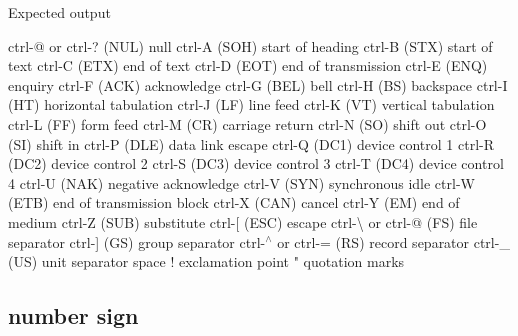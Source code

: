 Expected output

ctrl-\/@ or ctrl-\/? (N\+UL) null ctrl-\/A (S\+OH) start of heading ctrl-\/B (S\+TX) start of text ctrl-\/C (E\+TX) end of text ctrl-\/D (E\+OT) end of transmission ctrl-\/E (E\+NQ) enquiry ctrl-\/F (A\+CK) acknowledge ctrl-\/G (B\+EL) bell ctrl-\/H (BS) backspace ctrl-\/I (HT) horizontal tabulation ctrl-\/J (LF) line feed ctrl-\/K (VT) vertical tabulation ctrl-\/L (FF) form feed ctrl-\/M (CR) carriage return ctrl-\/N (SO) shift out ctrl-\/O (SI) shift in ctrl-\/P (D\+LE) data link escape ctrl-\/Q (D\+C1) device control 1 ctrl-\/R (D\+C2) device control 2 ctrl-\/S (D\+C3) device control 3 ctrl-\/T (D\+C4) device control 4 ctrl-\/U (N\+AK) negative acknowledge ctrl-\/V (S\+YN) synchronous idle ctrl-\/W (E\+TB) end of transmission block ctrl-\/X (C\+AN) cancel ctrl-\/Y (EM) end of medium ctrl-\/Z (S\+UB) substitute ctrl-\/\mbox{[} (E\+SC) escape ctrl-\/\textbackslash{} or ctrl-\/@ (FS) file separator ctrl-\/\mbox{]} (GS) group separator ctrl-\/$^\wedge$ or ctrl-\/= (RS) record separator ctrl-\/\+\_\+ (US) unit separator space ! exclamation point " quotation marks \subsection*{number sign}


